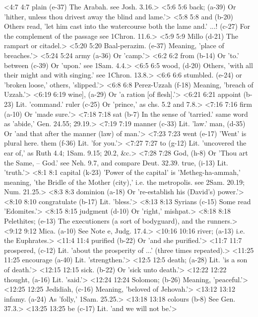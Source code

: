 <4:7 4:7  plain (e-37)  The Arabah. see Josh. 3.16.>
<5:6 5:6  back; (a-39)  Or 'hither, unless thou drivest away the blind and lame.'>
<5:8 5:8  and (b-20)  Others read, 'let him cast into the watercourse both the lame  and.'
  ...! (c-27)  For the complement of the passage see 1Chron. 11.6.>
<5:9 5:9  Millo (d-21)  The rampart or citadel.>
<5:20 5:20  Baal-perazim. (e-37)  Meaning, 'place of breaches.'>
<5:24 5:24  army (a-36)  Or 'camp.'>
<6:2 6:2  from (b-14)  Or 'to.'
  between (c-39)  Or 'upon.' see 1Sam. 4.4.>
<6:5 6:5  wood, (d-20)  Others, 'with all their might and with singing.' see 1Chron. 13.8.>
<6:6 6:6  stumbled. (e-24)  or 'broken loose,' others, 'slipped.'>
<6:8 6:8  Perez-Uzzah (f-18)  Meaning, 'breach of Uzzah.'>
<6:19 6:19  wine], (a-29)  Or 'a ration [of flesh].'>
<6:21 6:21  appoint (b-23)  Lit. 'command.'
  ruler (c-25)  Or 'prince,' as chs. 5.2 and 7.8.>
<7:16 7:16  firm (a-10)  Or 'made sure.'>
<7:18 7:18  sat (b-7)  In the sense of 'tarried.' same word as 'abide,' Gen. 24.55; 29.19.>
<7:19 7:19  manner (c-33)  Lit. 'law.'
  man, (d-35)  Or 'and that after the manner (law) of man.'>
<7:23 7:23  went (e-17)  'Went' is plural here.
  them (f-36)  Lit. 'for you.'>
<7:27 7:27  to (g-12)  Lit. 'uncovered the ear of,' as Ruth 4.4; 1Sam. 9.15; 20.2,  &c.>
<7:28 7:28  God, (h-8)  Or 'Thou art the Same, -- God.' see Neh. 9.7, and compare  Deut. 32.39.
  true, (i-13)  Lit. 'truth.'>
<8:1 8:1  capital (k-23)  'Power of the capital' is 'Metheg-ha-ammah,' meaning, 'the  Bridle of the Mother (city),' i.e. the metropolis. see 2Sam.  20.19; Num. 21.25.>
<8:3 8:3  dominion (a-18)  Or 're-establish his (David's) power.'>
<8:10 8:10  congratulate (b-17)  Lit. 'bless.'>
<8:13 8:13  Syrians (c-15)  Some read 'Edomites.'>
<8:15 8:15  judgment (d-10)  Or 'right,' mishpat.>
<8:18 8:18  Pelethites; (e-13)  The executioners (a sort of bodyguard), and the runners.>
<9:12 9:12  Mica. (a-10)  See Note e, Judg. 17.4.>
<10:16 10:16  river; (a-13)  i.e. the Euphrates.>
<11:4 11:4  purified (b-22)  Or 'and she purified.'>
<11:7 11:7  prospered, (c-12)  Lit. 'about the prosperity of ...' (three times repeated).>
<11:25 11:25  encourage (a-40)  Lit. 'strengthen.'>
<12:5 12:5  death; (a-28)  Lit. 'is a son of death.'>
<12:15 12:15  sick. (b-22)  Or 'sick unto death.'>
<12:22 12:22  thought, (a-16)  Lit. 'said.'>
<12:24 12:24  Solomon; (b-26)  Meaning, 'peaceful.'>
<12:25 12:25  Jedidiah, (c-16)  Meaning, 'beloved of Jehovah.'>
<13:12 13:12  infamy. (a-24)  As 'folly,' 1Sam. 25.25.>
<13:18 13:18  colours (b-8)  See Gen. 37.3.>
<13:25 13:25  be (c-17)  Lit. 'and we will not be.'>
